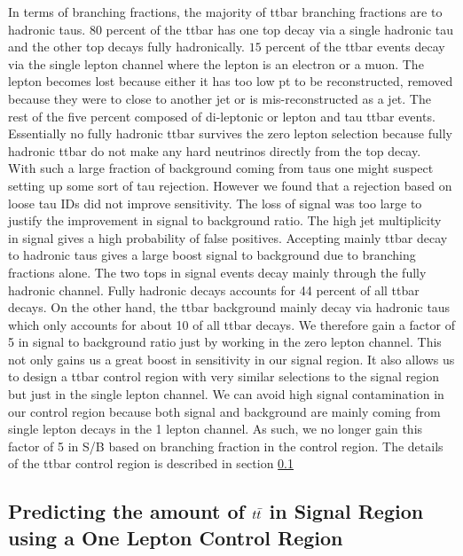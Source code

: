 \indent In terms of branching fractions, the majority of ttbar branching fractions are to hadronic taus.  80 percent of the ttbar has one top decay via a single hadronic tau and the other top decays fully hadronically.  $15$ percent of the ttbar events decay via the single lepton channel where the lepton is an electron or a muon.  The lepton becomes lost because either it has too low pt to be reconstructed, removed because they were to close to another jet or is mis-reconstructed as a jet. The rest of the five percent composed of di-leptonic or lepton and tau ttbar events. Essentially no fully hadronic ttbar survives the zero lepton selection because fully hadronic ttbar do not make any hard neutrinos directly from the top decay.  \\
\indent With such a large fraction of background coming from taus one might suspect setting up some sort of tau rejection.  However we found that a rejection based on loose tau IDs did not improve sensitivity.  The loss of signal was too large to justify the improvement in signal to background ratio.  The high jet multiplicity in signal gives a high probability of false positives.
\indent Accepting mainly ttbar decay to hadronic taus gives a large boost signal to background due to branching fractions alone.  The two tops in signal events decay mainly through the fully hadronic channel.  Fully hadronic decays accounts for 44 percent of all ttbar decays.  On the other hand, the ttbar background mainly decay via hadronic taus which only accounts for about 10 of all ttbar decays.  We therefore gain a factor of 5 in signal to background ratio just by working in the zero lepton channel. This not only gains us a great boost in sensitivity in our signal region.  It also allows us to design a ttbar control region with very similar selections to the signal region but just in the single lepton channel.  We can avoid high signal contamination in our control region because both signal and background are mainly coming from single lepton decays in the 1 lepton channel.  As such, we no longer gain this factor of 5 in S/B based on branching fraction in the control region.  The details of the ttbar control region is described in section \ref{sec:Bkg:ttbar:CR} \\  

\subsection{Predicting the amount of $t\bar{t}$ in Signal Region using a One Lepton Control Region}
\label{sec:Bkg:ttbar:CR}

